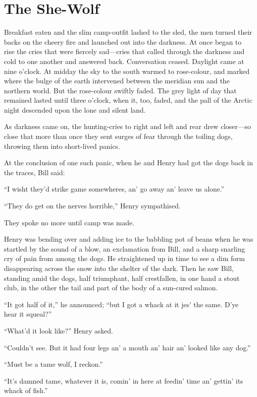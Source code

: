 \section{The She-Wolf}

Breakfast eaten and the slim camp-outfit lashed to the sled, the men
turned their backs on the cheery fire and launched out into the
darkness. At once began to rise the cries that were fiercely sad—cries
that called through the darkness and cold to one another and answered
back. Conversation ceased. Daylight came at nine o’clock. At midday the
sky to the south warmed to rose-colour, and marked where the bulge of
the earth intervened between the meridian sun and the northern world.
But the rose-colour swiftly faded. The grey light of day that remained
lasted until three o’clock, when it, too, faded, and the pall of the
Arctic night descended upon the lone and silent land.

As darkness came on, the hunting-cries to right and left and rear drew
closer—so close that more than once they sent surges of fear through
the toiling dogs, throwing them into short-lived panics.

At the conclusion of one such panic, when he and Henry had got the dogs
back in the traces, Bill said:

“I wisht they’d strike game somewheres, an’ go away an’ leave us
alone.”

“They do get on the nerves horrible,” Henry sympathised.

They spoke no more until camp was made.

Henry was bending over and adding ice to the babbling pot of beans when
he was startled by the sound of a blow, an exclamation from Bill, and a
sharp snarling cry of pain from among the dogs. He straightened up in
time to see a dim form disappearing across the snow into the shelter of
the dark. Then he saw Bill, standing amid the dogs, half triumphant,
half crestfallen, in one hand a stout club, in the other the tail and
part of the body of a sun-cured salmon.

“It got half of it,” he announced; “but I got a whack at it jes’ the
same. D’ye hear it squeal?”

“What’d it look like?” Henry asked.

“Couldn’t see. But it had four legs an’ a mouth an’ hair an’ looked
like any dog.”

“Must be a tame wolf, I reckon.”

“It’s damned tame, whatever it is, comin’ in here at feedin’ time an’
gettin’ its whack of fish.”

